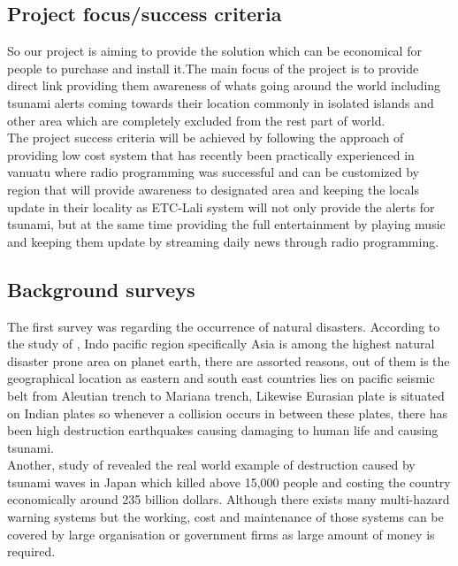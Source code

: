 \subsection{Project focus/success criteria}
So our project is aiming to provide the solution which can be economical for people to purchase and install it.The main focus of the project is to provide direct link providing them awareness of whats going around the world including tsunami alerts coming towards their location commonly in isolated islands and other area which are completely excluded from the rest part of world.\\

The project success criteria will be achieved by following the approach of providing low cost system that has recently been practically experienced in vanuatu where radio programming was successful and can be customized by region that will provide awareness to designated area and keeping the locals update in their locality as ETC-Lali system will not only provide the alerts for tsunami, but at the same time providing the full entertainment by playing music and keeping them update by streaming daily news through radio programming.\\

\subsection{ Background surveys}
The first survey was regarding the occurrence of natural disasters. According to the study of \cite{kokai2004natural}, Indo pacific region specifically Asia is among the highest natural disaster prone area on planet earth, there are assorted reasons, out of them is the geographical location as eastern and south east countries lies   on pacific seismic belt  from Aleutian trench to Mariana trench, Likewise Eurasian plate is situated on Indian plates so whenever a collision occurs in between these plates, there has been high destruction earthquakes causing damaging to human life and causing tsunami. \\

Another, study of \cite{thomas2013climate} revealed the real world example of destruction caused by tsunami waves in Japan which killed above 15,000 people and costing the country economically around 235 billion dollars. Although there exists many multi-hazard warning systems but the working, cost and maintenance of those systems can be covered by large organisation or government firms as large amount of money is required.\\


